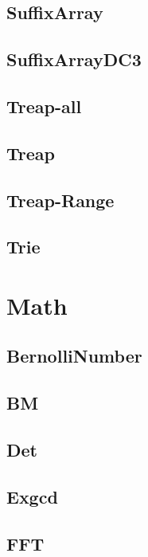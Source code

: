\documentclass{article}
\begin{document}
\subsection{SuffixArray}

\subsection{SuffixArrayDC3}

\subsection{Treap-all}

\subsection{Treap}

\subsection{Treap-Range}

\subsection{Trie}

\section{Math}
\subsection{BernolliNumber}

\subsection{BM}

\subsection{Det}

\subsection{Exgcd}

\subsection{FFT}

\end{document}
